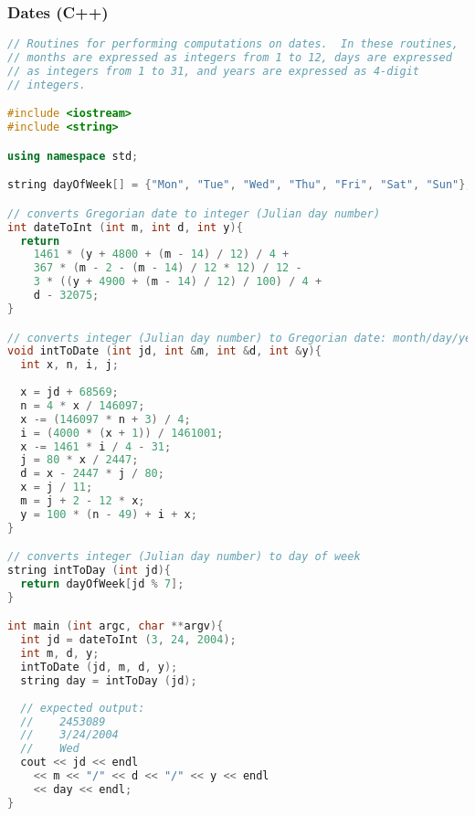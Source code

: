 \subsubsection{Dates (C++)}
\begin{lstlisting}[language=C++]
// Routines for performing computations on dates.  In these routines,
// months are expressed as integers from 1 to 12, days are expressed
// as integers from 1 to 31, and years are expressed as 4-digit
// integers.

#include <iostream>
#include <string>

using namespace std;

string dayOfWeek[] = {"Mon", "Tue", "Wed", "Thu", "Fri", "Sat", "Sun"};

// converts Gregorian date to integer (Julian day number)
int dateToInt (int m, int d, int y){  
  return 
    1461 * (y + 4800 + (m - 14) / 12) / 4 +
    367 * (m - 2 - (m - 14) / 12 * 12) / 12 - 
    3 * ((y + 4900 + (m - 14) / 12) / 100) / 4 + 
    d - 32075;
}

// converts integer (Julian day number) to Gregorian date: month/day/year
void intToDate (int jd, int &m, int &d, int &y){
  int x, n, i, j;
  
  x = jd + 68569;
  n = 4 * x / 146097;
  x -= (146097 * n + 3) / 4;
  i = (4000 * (x + 1)) / 1461001;
  x -= 1461 * i / 4 - 31;
  j = 80 * x / 2447;
  d = x - 2447 * j / 80;
  x = j / 11;
  m = j + 2 - 12 * x;
  y = 100 * (n - 49) + i + x;
}

// converts integer (Julian day number) to day of week
string intToDay (int jd){
  return dayOfWeek[jd % 7];
}

int main (int argc, char **argv){
  int jd = dateToInt (3, 24, 2004);
  int m, d, y;
  intToDate (jd, m, d, y);
  string day = intToDay (jd);
  
  // expected output:
  //    2453089
  //    3/24/2004
  //    Wed
  cout << jd << endl
    << m << "/" << d << "/" << y << endl
    << day << endl;
}
\end{lstlisting}
